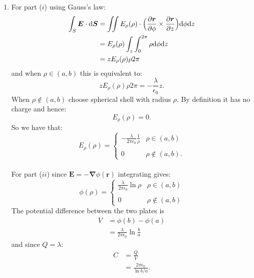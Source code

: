 \begin{enumerate}
    \newpage

    \item For part ($i$) using Gauss's law:
    \begin{align*}
        \int_S\boldsymbol{E}\cdot
        \dd\boldsymbol{S}
        &=\iint E_{\rho}(\rho)
        \cdot
        \Bigl(\frac{\partial\boldsymbol{r}}
        {\partial\phi}
        \times
        \frac{\partial\boldsymbol{r}}
        {\partial z}\Bigr)
        \dd\phi\dd z \\
        &=E_{\rho}(\rho)\int_z
        \int_{0}^{2\pi}\rho\dd\phi\dd z \\
        &=z E_{\rho}(\rho)\rho 2\pi
    \end{align*}
    and when $\rho\in(a,b)$ this is equivalent to:
    $$z E_{\rho}(\rho)\rho 2\pi
    =-\frac{\lambda}{\epsilon_0}z.$$
    When $\rho\notin(a,b)$ choose spherical shell
    with radius $\rho$. By definition it has no charge
    and hence:
    $$E_{\rho}(\rho)=0.$$
    So we have that:
    $$E_{\rho}(\rho)=
    \left\{
	\begin{array}{ll}
		\displaystyle-\frac{\lambda}
        {2\pi\epsilon_0}\frac{1}{\rho}
        & \mbox{$\rho\in(a,b)$} \\\\
		0 
        & \mbox{$\rho\notin(a,b)$.}
	\end{array}
    \right.$$ \\

    For part ($ii$) since $\boldsymbol{E}=
    -\boldsymbol{\nabla}\phi
    (\boldsymbol{r})$ integrating gives:
    $$\phi(\rho)=
    \left\{
	\begin{array}{ll}
		\displaystyle\frac{\lambda}
        {2\pi\epsilon_0}\ln{\rho}
        & \mbox{$\rho\in(a,b)$} \\\\
		0 
        & \mbox{$\rho\notin(a,b)$}
	\end{array}
    \right.$$
    The potential difference between the
    two plates is
    \begin{align*}
        V
        &=\phi(b)-\phi(a) \\
        &=\frac{\lambda}
        {2\pi\epsilon_0}\ln{\frac{b}{a}}
    \end{align*}
    and since $Q=\lambda$:
    \begin{align*}
        C
        &=\frac{Q}{V} \\
        &=\frac{2\pi\epsilon_0}{\ln b/a}.
    \end{align*}

    \newpage


\end{enumerate}
